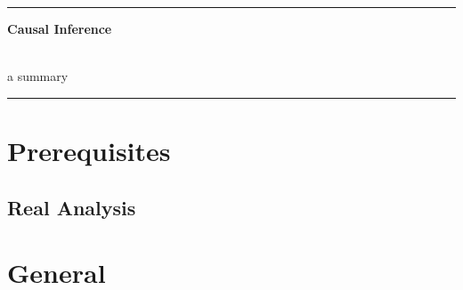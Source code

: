 \documentclass[8pt,twoside]{extarticle}
\begin{document}
\vspace*{18em}

\hrule
\begin{center}
{\fontsize{30}{60}\selectfont \textbf{Causal Inference}} \\ \

{\fontsize{20}{60}\selectfont a summary}
\end{center}
\hrule



\tableofcontents



\raggedright %
\setlength{\parindent}{15pt} %
\setlength{\columnseprule}{0.3pt} %





\section{Prerequisites}

\subsection[Real Analysis]{Real Analysis \citep{abbott2015understanding}}
















\section{General}
\end{document}
